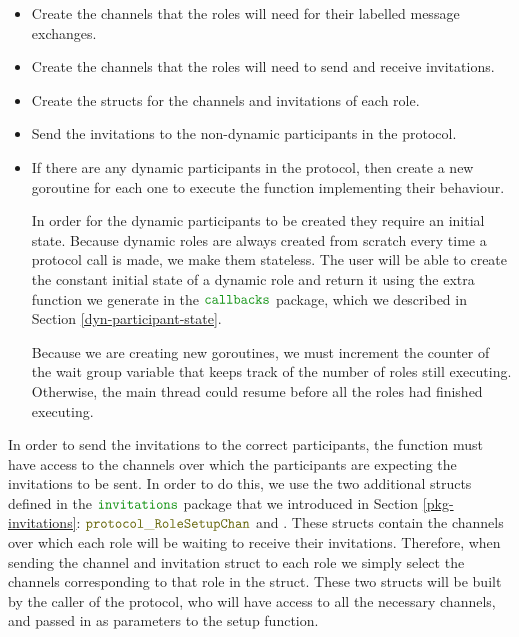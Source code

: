 \documentclass[12pt,twoside]{report}
\begin{document}
\begin{itemize}
    \item Create the channels that the roles will need for their labelled message exchanges.
    \item Create the channels that the roles will need to send and receive invitations.
    \item Create the structs for the channels and invitations of each role.
    \item Send the invitations to the non-dynamic participants in the protocol.
    \item If there are any dynamic participants in the protocol, then create a new goroutine for each one to execute the function implementing their behaviour.
    
    In order for the dynamic participants to be created they require an initial state. Because dynamic roles are always created from scratch every time a protocol call is made, we make them stateless. The user will be able to create the constant initial state of a dynamic role and return it using the extra function we generate in the $\pkgname{callbacks}$ package, which we described in Section \ref{dyn-participant-state}.

    Because we are creating new goroutines, we must increment the counter of the wait group variable that keeps track of the number of roles still executing. Otherwise, the main thread could resume before all the roles had finished executing.
\end{itemize}

In order to send the invitations to the correct participants, the function must have access to the channels over which the participants are expecting the invitations to be sent. In order to do this, we use the two additional structs defined in  the $\pkgname{invitations}$ package that we introduced in Section \ref{pkg-invitations}: $\structname{protocol\_RoleSetupChan}$ and {\color{dkyellow} \texttt{}}. These structs contain the channels over which each role will be waiting to receive their invitations. Therefore, when sending the channel and invitation struct to each role we simply select the channels corresponding to that role in the struct. These two structs will be built by the caller of the protocol, who will have access to all the necessary channels, and passed in as parameters to the setup function.
\end{document}
